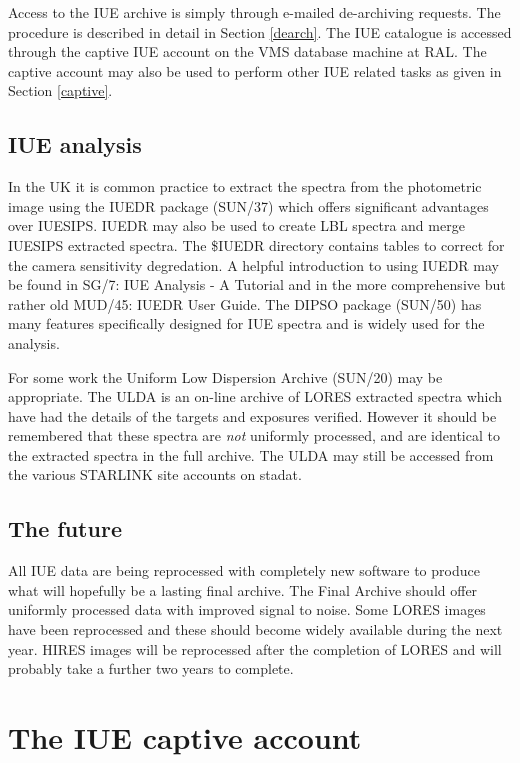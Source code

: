 Access to the IUE archive is simply through e-mailed de-archiving requests.
The procedure is described in detail in Section \ref{dearch}.
The IUE catalogue is accessed through the captive IUE account on the VMS
database machine at RAL.
The captive account may also be used to perform other 
IUE related tasks as given in Section \ref{captive}.

\subsection {IUE analysis}

In the UK it is common practice to extract the spectra from the photometric
image using the IUEDR package (SUN/37)
which offers significant advantages over IUESIPS.
IUEDR may also be used to create LBL spectra and merge IUESIPS extracted 
spectra.
The \$IUEDR directory contains tables to correct for the camera sensitivity
degredation.
A helpful introduction to using IUEDR may be found in SG/7: IUE Analysis - A
Tutorial and in the more comprehensive but rather old MUD/45: IUEDR User
Guide.
The DIPSO package (SUN/50) has many features specifically designed for IUE
spectra and is widely used for the analysis.

For some work the Uniform Low Dispersion Archive (SUN/20) may be appropriate.
The ULDA is an on-line archive of LORES extracted spectra which have had the 
details of the targets and exposures verified. 
However it should be remembered that 
these spectra are {\it not} uniformly processed, and are identical to the 
extracted spectra in the full archive.
The ULDA may still be accessed from the various STARLINK site accounts on
stadat.

\subsection {The future}

All IUE data are being reprocessed with completely new software to produce what
will hopefully be a lasting final archive.
The Final Archive should offer uniformly processed data with improved signal to
noise.
Some LORES images have been reprocessed and these should become widely
available during the next year.
HIRES images will be reprocessed after the completion of LORES and will
probably take a further two years to complete.

\section {The IUE captive account
\label{captive}}

